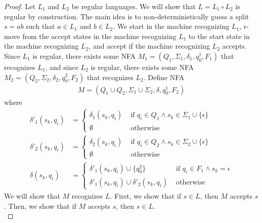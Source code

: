 \documentclass{article}
\begin{document}
\begin{proof}
    Let $L_1$ and $L_2$ be regular languages. We will show that $L = L_1 \circ L_2$ is regular by construction. The main idea is to non-deterministically guess 
    a split $s = a b$ such that $a \in L_1$ and $b \in L_2$. We start in the machine recognizing $L_1$, $\epsilon$-move from the accept states in the machine 
    recognizing $L_1$ to the start state in the machine recognizing $L_2$, and accept if the machine recognizing $L_2$ accepts.  \\

    \noindent
    Since $L_1$ is regular, there exists some NFA $M_1 = (Q_1, \Sigma_1, \delta_1, q_0^1, F_1)$ that recognizes $L_1$, and since $L_2$ is regular, there exists
    some NFA $M_2 = (Q_2, \Sigma_2, \delta_2, q_0^2, F_2)$ that recognizes $L_2$. Define NFA
    \begin{align*}
        M = (Q_1 \cup Q_2, \Sigma_1 \cup \Sigma_2, \delta, q_0^1, F_2)
    \end{align*}
    where
    \begin{align*}
        \delta'_1(s_k, q_i) &= \begin{cases}
            \delta_1(s_k, q_i) & \text{ if } q_i \in Q_1 \land s_k \in \Sigma_1 \cup \{ \epsilon \} \\
            \emptyset & \text{ otherwise}
        \end{cases} \\
        \delta'_2(s_k, q_i) &= \begin{cases}
            \delta_2(s_k, q_i) & \text{ if } q_i \in Q_2 \land s_k \in \Sigma_2 \cup \{ \epsilon \} \\
            \emptyset & \text{ otherwise}
        \end{cases} \\
        \delta(s_k, q_i) &= \begin{cases}
            \delta'_1(s_k, q_i) \cup \{ q_0^2 \} & \text{ if } q_i \in F_1 \land s_k = \epsilon \\
            \delta'_1(s_k, q_i) \cup \delta'_2(s_k, q_i) & \text{ otherwise}
        \end{cases}
    \end{align*}
    We will show that $M$ recognizes $L$. First, we show that if $s \in L$, then $M$ accepts $s$. Then, we show that if $M$ accepts $s$, then $s \in L$. \\


\end{proof}
\end{document}
